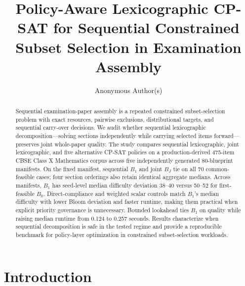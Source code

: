 \documentclass[runningheads]{llncs}
\begin{document}
\title{Policy-Aware Lexicographic CP-SAT for Sequential Constrained Subset Selection in Examination Assembly}

\author{Anonymous Author(s)}

\maketitle

\begin{abstract}
Sequential examination-paper assembly is a repeated constrained subset-selection problem with exact resources, pairwise exclusions, distributional targets, and sequential carry-over decisions. We audit whether sequential lexicographic decomposition---solving sections independently while carrying selected items forward---preserves joint whole-paper quality. The study compares sequential lexicographic, joint lexicographic, and five alternative CP-SAT policies on a production-derived 475-item CBSE Class X Mathematics corpus across five independently generated 80-blueprint manifests. On the fixed manifest, sequential $B_1$ and joint $B_J$ tie on all 70 common-feasible cases; four section orderings also retain identical aggregate medians. Across manifests, $B_1$ has seed-level median difficulty deviation 38--40 versus 50--52 for first-feasible $B_0$. Direct-compliance and weighted scalar controls match $B_1$'s median difficulty with lower Bloom deviation and faster runtime, making them practical when explicit priority governance is unnecessary. Bounded lookahead ties $B_1$ on quality while raising median runtime from 0.124 to 0.257 seconds. Results characterize when sequential decomposition is safe in the tested regime and provide a reproducible benchmark for policy-layer optimization in constrained subset-selection workloads.
\end{abstract}

\section{Introduction}
\label{sec:intro}
\end{document}
